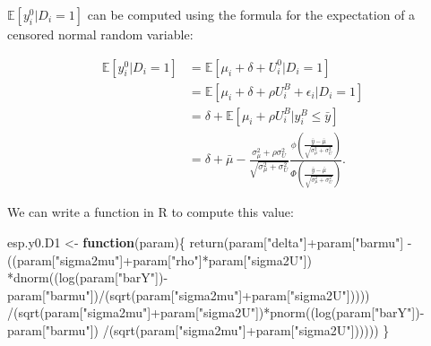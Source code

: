\documentclass[
]{book}
\newenvironment{Shaded}{\begin{snugshade}}{\end{snugshade}}
\newcommand{\ControlFlowTok}[1]{\textcolor[rgb]{0.13,0.29,0.53}{\textbf{#1}}}
\newcommand{\FunctionTok}[1]{\textcolor[rgb]{0.00,0.00,0.00}{#1}}
\newcommand{\NormalTok}[1]{#1}
\newcommand{\OtherTok}[1]{\textcolor[rgb]{0.56,0.35,0.01}{#1}}
\newcommand{\SpecialCharTok}[1]{\textcolor[rgb]{0.00,0.00,0.00}{#1}}
\newcommand{\StringTok}[1]{\textcolor[rgb]{0.31,0.60,0.02}{#1}}
\newcommand{\esp}[1]{\mathbb{E}[ #1 ]}
\theoremstyle{definition}
\theoremstyle{definition}
\theoremstyle{definition}
\theoremstyle{definition}
\theoremstyle{remark}
\begin{document}
\(\esp{y_i^0|D_i=1}\) can be computed using the formula for the expectation of a censored normal random variable:

\begin{align*}
\esp{y_i^0|D_i=1} & = \esp{\mu_i+\delta+U_i^0|D_i=1}\\
                  & = \esp{\mu_i+\delta+\rho U_i^B+\epsilon_i|D_i=1}\\
                  & = \delta + \esp{\mu_i+\rho U_i^B|y_i^B\leq\bar{y}}\\
                  & = \delta + \bar{\mu} - \frac{\sigma^2_{\mu}+\rho\sigma^2_U}{\sqrt{\sigma^2_{\mu}+\sigma^2_{U}}}\frac{\phi\left(\frac{\bar{y}-\bar{\mu}}{\sqrt{\sigma^2_{\mu}+\sigma^2_{U}}}\right)}{\Phi\left(\frac{\bar{y}-\bar{\mu}}{\sqrt{\sigma^2_{\mu}+\sigma^2_{U}}}\right)}.
\end{align*}

We can write a function in R to compute this value:

\begin{Shaded}
\begin{Highlighting}[]
\NormalTok{esp.y0.D1 }\OtherTok{\textless{}{-}} \ControlFlowTok{function}\NormalTok{(param)\{}
  \FunctionTok{return}\NormalTok{(param[}\StringTok{"delta"}\NormalTok{]}\SpecialCharTok{+}\NormalTok{param[}\StringTok{"barmu"}\NormalTok{]}
         \SpecialCharTok{{-}}\NormalTok{((param[}\StringTok{"sigma2mu"}\NormalTok{]}\SpecialCharTok{+}\NormalTok{param[}\StringTok{"rho"}\NormalTok{]}\SpecialCharTok{*}\NormalTok{param[}\StringTok{"sigma2U"}\NormalTok{])}
           \SpecialCharTok{*}\FunctionTok{dnorm}\NormalTok{((}\FunctionTok{log}\NormalTok{(param[}\StringTok{"barY"}\NormalTok{])}\SpecialCharTok{{-}}\NormalTok{param[}\StringTok{"barmu"}\NormalTok{])}\SpecialCharTok{/}\NormalTok{(}\FunctionTok{sqrt}\NormalTok{(param[}\StringTok{"sigma2mu"}\NormalTok{]}\SpecialCharTok{+}\NormalTok{param[}\StringTok{"sigma2U"}\NormalTok{]))))}
         \SpecialCharTok{/}\NormalTok{(}\FunctionTok{sqrt}\NormalTok{(param[}\StringTok{"sigma2mu"}\NormalTok{]}\SpecialCharTok{+}\NormalTok{param[}\StringTok{"sigma2U"}\NormalTok{])}\SpecialCharTok{*}\FunctionTok{pnorm}\NormalTok{((}\FunctionTok{log}\NormalTok{(param[}\StringTok{"barY"}\NormalTok{])}\SpecialCharTok{{-}}\NormalTok{param[}\StringTok{"barmu"}\NormalTok{])}
                                                          \SpecialCharTok{/}\NormalTok{(}\FunctionTok{sqrt}\NormalTok{(param[}\StringTok{"sigma2mu"}\NormalTok{]}\SpecialCharTok{+}\NormalTok{param[}\StringTok{"sigma2U"}\NormalTok{])))))}
\NormalTok{\}}
\end{Highlighting}
\end{Shaded}
\end{document}

